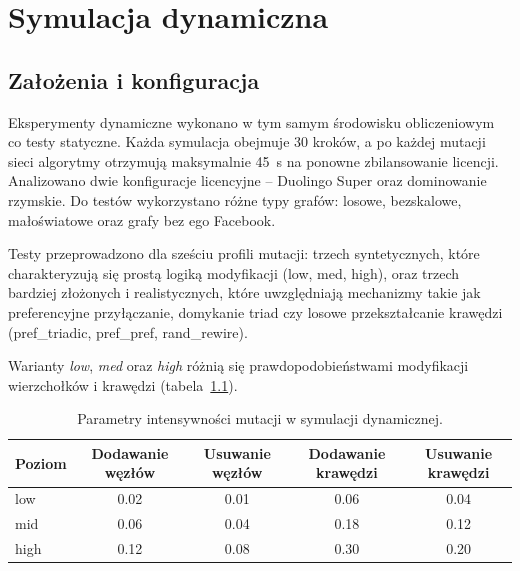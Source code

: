 \chapter{Symulacja dynamiczna}\label{chap:dynamic}

\section{Założenia i konfiguracja}

Eksperymenty dynamiczne wykonano w tym samym środowisku obliczeniowym co testy statyczne. Każda symulacja obejmuje 30 kroków, a po każdej mutacji sieci algorytmy otrzymują maksymalnie 45~s na ponowne zbilansowanie licencji. Analizowano dwie konfiguracje licencyjne -- Duolingo Super oraz dominowanie rzymskie. Do testów wykorzystano różne typy grafów: losowe, bezskalowe, małoświatowe oraz grafy bez ego Facebook.

Testy przeprowadzono dla sześciu profili mutacji: trzech syntetycznych, które charakteryzują się prostą logiką modyfikacji (low, med, high), oraz trzech bardziej złożonych i realistycznych, które uwzględniają mechanizmy takie jak preferencyjne przyłączanie, domykanie triad czy losowe przekształcanie krawędzi (pref\_triadic, pref\_pref, rand\_rewire).

Warianty \emph{low}, \emph{med} oraz \emph{high} różnią się prawdopodobieństwami modyfikacji wierzchołków i krawędzi (tabela~\ref{tab:dyn-mutation-levels}).

\begin{table}[H]
  \centering
  \caption{Parametry intensywności mutacji w symulacji dynamicznej.}
  \label{tab:dyn-mutation-levels}
  \begin{tabular}{lcccc}
    \toprule
    \textbf{Poziom} & \textbf{Dodawanie węzłów} & \textbf{Usuwanie węzłów} & \textbf{Dodawanie krawędzi} & \textbf{Usuwanie krawędzi} \\
    \midrule
    low             & 0.02                      & 0.01                     & 0.06                        & 0.04                       \\
    mid             & 0.06                      & 0.04                     & 0.18                        & 0.12                       \\
    high            & 0.12                      & 0.08                     & 0.30                        & 0.20                       \\
  \end{tabular}
\end{table}


